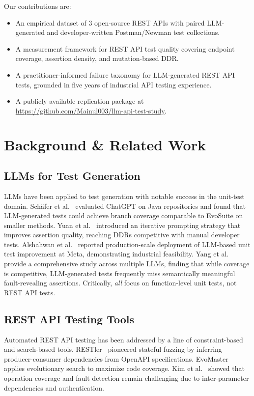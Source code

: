 \documentclass[sigconf,review,anonymous=false]{acmart}
\begin{document}
Our contributions are:
\begin{itemize}
  \item An empirical dataset of 3 open-source REST APIs with paired
    LLM-generated and developer-written Postman/Newman test collections.
  \item A measurement framework for REST API test quality covering endpoint
    coverage, assertion density, and mutation-based DDR.
  \item A practitioner-informed failure taxonomy for LLM-generated REST API
    tests, grounded in five years of industrial API testing experience.
  \item A publicly available replication package at
    \url{https://github.com/Mainul003/llm-api-test-study}.
\end{itemize}

\section{Background \& Related Work}\label{sec:related}

\subsection{LLMs for Test Generation}
LLMs have been applied to test generation with notable success in the
unit-test domain. Sch\"{a}fer et al.~\cite{Schafer2024} evaluated ChatGPT
on \mbox{Java} repositories and found that LLM-generated tests could achieve
branch coverage comparable to EvoSuite on smaller methods. Yuan et
al.~\cite{Yuan2023} introduced an iterative prompting strategy that
improves assertion quality, reaching DDRs competitive with manual developer
tests. Alshahwan et al.~\cite{Alshahwan2024} reported production-scale
deployment of LLM-based unit test improvement at Meta, demonstrating
industrial feasibility. Yang et al.~\cite{Yang2024} provide a comprehensive
study across multiple LLMs, finding that while coverage is competitive,
LLM-generated tests frequently miss semantically meaningful fault-revealing
assertions. Critically, \emph{all} focus on function-level unit tests, not REST API tests.

\subsection{REST API Testing Tools}
Automated REST API testing has been addressed by a line of constraint-based
and search-based tools. RESTler~\cite{Atlidakis2019} pioneered stateful
fuzzing by inferring producer-consumer dependencies from OpenAPI
specifications. EvoMaster~\cite{Arcuri2019} applies evolutionary search to
maximize code coverage. Kim et al.~\cite{Kim2022} showed that operation coverage and fault detection
remain challenging due to inter-parameter dependencies and authentication.
\end{document}
